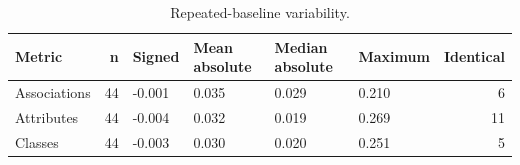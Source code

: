 \begin{table}

\caption{Repeated-baseline variability.}
\centering
\begin{tabular}[t]{lrllllr}
\toprule
Metric & n & Signed & Mean absolute & Median absolute & Maximum & Identical\\
\midrule
Associations & 44 & -0.001 & 0.035 & 0.029 & 0.210 & 6\\
Attributes & 44 & -0.004 & 0.032 & 0.019 & 0.269 & 11\\
Classes & 44 & -0.003 & 0.030 & 0.020 & 0.251 & 5\\
\bottomrule
\end{tabular}
\end{table}

